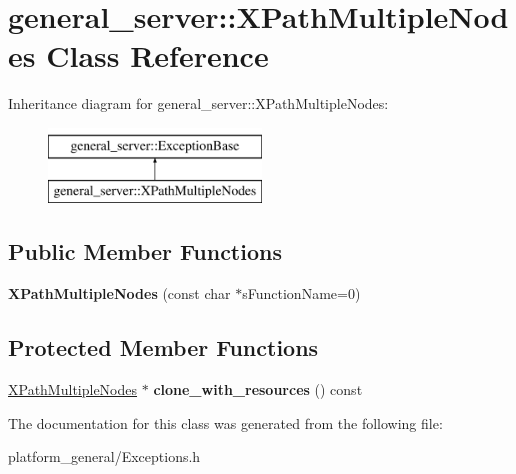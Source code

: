 \hypertarget{classgeneral__server_1_1XPathMultipleNodes}{\section{general\-\_\-server\-:\-:\-X\-Path\-Multiple\-Nodes \-Class \-Reference}
\label{classgeneral__server_1_1XPathMultipleNodes}
}
\-Inheritance diagram for general\-\_\-server\-:\-:\-X\-Path\-Multiple\-Nodes\-:\begin{figure}[H]
\begin{center}
\leavevmode
\includegraphics[height=2.000000cm]{classgeneral__server_1_1XPathMultipleNodes}
\end{center}
\end{figure}
\subsection*{\-Public \-Member \-Functions}
\begin{DoxyCompactItemize}
\item 
\hypertarget{classgeneral__server_1_1XPathMultipleNodes_ae10b5e7ca3425b3a5d5cbff4d4af105f}{{\bfseries \-X\-Path\-Multiple\-Nodes} (const char $\ast$s\-Function\-Name=0)}\label{classgeneral__server_1_1XPathMultipleNodes_ae10b5e7ca3425b3a5d5cbff4d4af105f}

\end{DoxyCompactItemize}
\subsection*{\-Protected \-Member \-Functions}
\begin{DoxyCompactItemize}
\item 
\hypertarget{classgeneral__server_1_1XPathMultipleNodes_af61402ce16a169b9538d67b00232377a}{\hyperlink{classgeneral__server_1_1XPathMultipleNodes}{\-X\-Path\-Multiple\-Nodes} $\ast$ {\bfseries clone\-\_\-with\-\_\-resources} () const }\label{classgeneral__server_1_1XPathMultipleNodes_af61402ce16a169b9538d67b00232377a}

\end{DoxyCompactItemize}


\-The documentation for this class was generated from the following file\-:\begin{DoxyCompactItemize}
\item 
platform\-\_\-general/\-Exceptions.\-h\end{DoxyCompactItemize}
